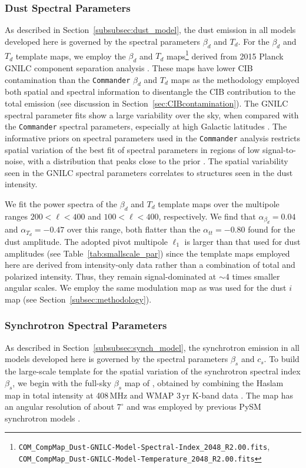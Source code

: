 \documentclass[twocolumn]{aastex631}
\begin{document}
\subsubsection{Dust Spectral Parameters}\label{subsec:dust_spec_params}

As described in Section~\ref{subsubsec:dust_model}, the dust emission in all models developed here is governed by the spectral parameters $\beta_d$ and $T_d$. For the $\beta_d$ and $T_d$ template maps, we employ the $\beta_d$ and $T_d$ maps\footnote{\texttt{COM\_CompMap\_Dust-GNILC-Model-Spectral-Index\_2048\_R2.00.fits}, \texttt{COM\_CompMap\_Dust-GNILC-Model-Temperature\_2048\_R2.00.fits}} derived from 2015 Planck GNILC component separation analysis \citep{planck2016-XLVIII}. These maps have lower CIB contamination than the \texttt{Commander} $\beta_d$ and $T_d$ maps \citep{planck2014-a12} as the methodology employed both spatial and spectral information to disentangle the CIB contribution to the total emission (see discussion in Section~\ref{sec:CIBcontamination}). The GNILC spectral parameter fits show a large variability over the sky, when compared with the \texttt{Commander} spectral parameters, especially at high Galactic latitudes \citep{planck2016-XLVIII}. The informative priors on spectral parameters used in the \texttt{Commander} analysis restricts spatial variation of the best fit of spectral parameters in regions of low signal-to-noise, with a distribution that peaks close to the prior \citep{planck2014-a12}. The spatial variability seen in the GNILC spectral parameters correlates to structures seen in the dust intensity. 

We fit the power spectra of the $\beta_d$ and $T_d$ template maps over the multipole ranges $200 < \ell < 400$ and $100 < \ell < 400$, respectively. We find that $\alpha_{\beta_d}= 0.04$ and $\alpha_{T_d} = -0.47$ over this range, both flatter than the $\alpha_{tt} = -0.80$ found for the dust amplitude. The adopted pivot multipole $\ell_1$ is larger than that used for dust amplitudes (see Table~\ref{tab:smallscale_par}) since the template maps employed here are derived from intensity-only data rather than a combination of total and polarized intensity. Thus, they remain signal-dominated at $\sim$4 times smaller angular scales. We employ the same modulation map as was used for the dust $i$ map (see Section~\ref{subsec:methodology}).

\subsubsection{Synchrotron Spectral Parameters}\label{sec:beta_s}
As described in Section~\ref{subsubsec:synch_model}, the synchrotron emission in all models developed here is governed by the spectral parameters $\beta_s$ and $c_s$. To build the large-scale template for the spatial variation of the synchrotron spectral index $\beta_s$, we begin with the full-sky $\beta_s$ map of \citet{Miville-Deschenes:2008}, obtained by combining the Haslam map in total intensity at 408\,MHz \citep{Remazeilles:2015} and WMAP 3\,yr K-band data \citep{Hinshaw:2007}. The map has an angular resolution of about $7^{\circ}$ and was employed by previous PySM synchrotron models \citep{Thorne:2017}.
\end{document}
